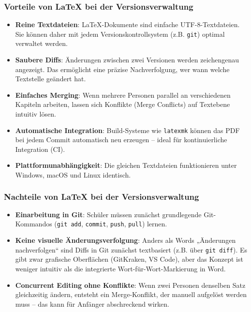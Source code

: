 \documentclass[a4paper,12pt]{article}
\begin{document}
	\subsubsection{Vorteile von \LaTeX{} bei der Versionsverwaltung}
	\begin{itemize}
		\item \textbf{Reine Textdateien}: \LaTeX-Dokumente sind einfache UTF-8-Textdateien. Sie können daher mit jedem Versionskontrollsystem (z.B. \texttt{git}) optimal verwaltet werden.
		\item \textbf{Saubere Diffs}: Änderungen zwischen zwei Versionen werden zeichengenau angezeigt. Das ermöglicht eine präzise Nachverfolgung, wer wann welche Textstelle geändert hat.
		\item \textbf{Einfaches Merging}: Wenn mehrere Personen parallel an verschiedenen Kapiteln arbeiten, lassen sich Konflikte (Merge Conflicts) auf Textebene intuitiv lösen.
		\item \textbf{Automatische Integration}: Build-Systeme wie \texttt{latexmk} können das PDF bei jedem Commit automatisch neu erzeugen – ideal für kontinuierliche Integration (CI).
		\item \textbf{Plattformunabhängigkeit}: Die gleichen Textdateien funktionieren unter Windows, macOS und Linux identisch.
	\end{itemize}
	
	\subsubsection{Nachteile von \LaTeX{} bei der Versionsverwaltung}
	\begin{itemize}
		\item \textbf{Einarbeitung in Git}: Schüler müssen zunächst grundlegende Git-Kommandos (\texttt{git add}, \texttt{commit}, \texttt{push}, \texttt{pull}) lernen.
		\item \textbf{Keine visuelle Änderungsverfolgung}: Anders als Words „Änderungen nachverfolgen“ sind Diffs in Git zunächst textbasiert (z.B. über \texttt{git diff}). Es gibt zwar grafische Oberflächen (GitKraken, VS Code), aber das Konzept ist weniger intuitiv als die integrierte Wort-für-Wort-Markierung in Word.
		\item \textbf{Concurrent Editing ohne Konflikte}: Wenn zwei Personen denselben Satz gleichzeitig ändern, entsteht ein Merge-Konflikt, der manuell aufgelöst werden muss – das kann für Anfänger abschreckend wirken.
	\end{itemize}
	
\end{document}
